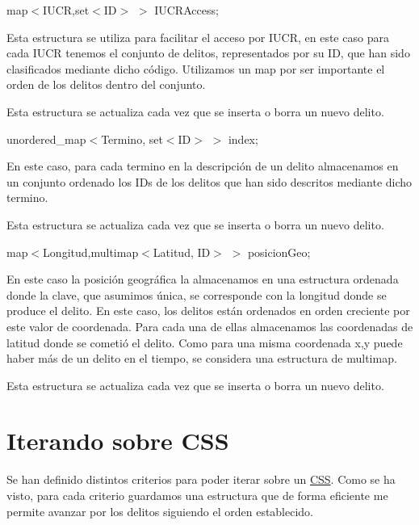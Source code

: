 \begin{DoxyItemize}
\item map$<$I\+U\+C\+R,set$<$\+I\+D$>$ $>$ I\+U\+C\+R\+Access;\end{DoxyItemize}
Esta estructura se utiliza para facilitar el acceso por I\+U\+C\+R, en este caso para cada I\+U\+C\+R tenemos el conjunto de delitos, representados por su I\+D, que han sido clasificados mediante dicho código. Utilizamos un map por ser importante el orden de los delitos dentro del conjunto.

Esta estructura se actualiza cada vez que se inserta o borra un nuevo delito.

\begin{DoxyItemize}
\item unordered\+\_\+map$<$Termino, set$<$\+I\+D$>$ $>$ index;\end{DoxyItemize}
En este caso, para cada termino en la descripción de un delito almacenamos en un conjunto ordenado los I\+Ds de los delitos que han sido descritos mediante dicho termino.

Esta estructura se actualiza cada vez que se inserta o borra un nuevo delito.

\begin{DoxyItemize}
\item map$<$Longitud,multimap$<$\+Latitud, I\+D$>$ $>$ posicion\+Geo;\end{DoxyItemize}
En este caso la posición geográfica la almacenamos en una estructura ordenada donde la clave, que asumimos única, se corresponde con la longitud donde se produce el delito. En este caso, los delitos están ordenados en orden creciente por este valor de coordenada. Para cada una de ellas almacenamos las coordenadas de latitud donde se cometió el delito. Como para una misma coordenada x,y puede haber más de un delito en el tiempo, se considera una estructura de multimap.

Esta estructura se actualiza cada vez que se inserta o borra un nuevo delito.\hypertarget{index_iterando}{}\section{Iterando sobre C\+S\+S}\label{index_iterando}
Se han definido distintos criterios para poder iterar sobre un \hyperlink{classCSS}{C\+S\+S}. Como se ha visto, para cada criterio guardamos una estructura que de forma eficiente me permite avanzar por los delitos siguiendo el orden establecido.

